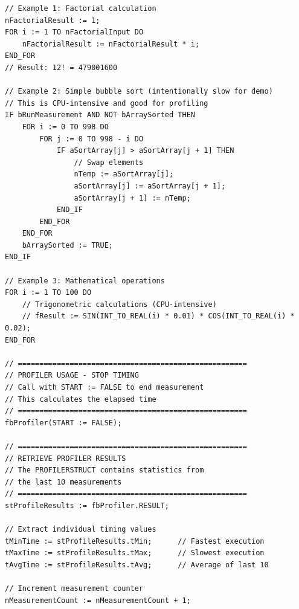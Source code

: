 \documentclass[11pt,a4paper]{article}
\begin{document}
\begin{lstlisting}
// Example 1: Factorial calculation
nFactorialResult := 1;
FOR i := 1 TO nFactorialInput DO
    nFactorialResult := nFactorialResult * i;
END_FOR
// Result: 12! = 479001600

// Example 2: Simple bubble sort (intentionally slow for demo)
// This is CPU-intensive and good for profiling
IF bRunMeasurement AND NOT bArraySorted THEN
    FOR i := 0 TO 998 DO
        FOR j := 0 TO 998 - i DO
            IF aSortArray[j] > aSortArray[j + 1] THEN
                // Swap elements
                nTemp := aSortArray[j];
                aSortArray[j] := aSortArray[j + 1];
                aSortArray[j + 1] := nTemp;
            END_IF
        END_FOR
    END_FOR
    bArraySorted := TRUE;
END_IF

// Example 3: Mathematical operations
FOR i := 1 TO 100 DO
    // Trigonometric calculations (CPU-intensive)
    // fResult := SIN(INT_TO_REAL(i) * 0.01) * COS(INT_TO_REAL(i) * 0.02);
END_FOR

// =====================================================
// PROFILER USAGE - STOP TIMING
// Call with START := FALSE to end measurement
// This calculates the elapsed time
// =====================================================
fbProfiler(START := FALSE);

// =====================================================
// RETRIEVE PROFILER RESULTS
// The PROFILERSTRUCT contains statistics from
// the last 10 measurements
// =====================================================
stProfileResults := fbProfiler.RESULT;

// Extract individual timing values
tMinTime := stProfileResults.tMin;      // Fastest execution
tMaxTime := stProfileResults.tMax;      // Slowest execution
tAvgTime := stProfileResults.tAvg;      // Average of last 10

// Increment measurement counter
nMeasurementCount := nMeasurementCount + 1;
\end{lstlisting}
\end{document}
